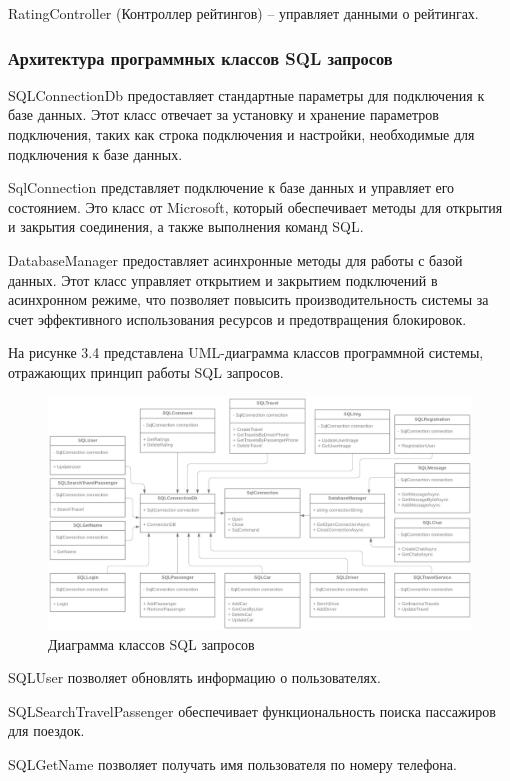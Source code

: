 RatingController (Контроллер рейтингов) -- управляет данными о рейтингах.


\subsubsection{Архитектура программных классов SQL запросов}

SQLConnectionDb предоставляет стандартные параметры для подключения к базе данных. Этот класс отвечает за установку и хранение параметров подключения, таких как строка подключения и настройки, необходимые для подключения к базе данных.

SqlConnection представляет подключение к базе данных и управляет его состоянием. Это класс от Microsoft, который обеспечивает методы для открытия и закрытия соединения, а также выполнения команд SQL.

DatabaseManager предоставляет асинхронные методы для работы с базой данных. Этот класс управляет открытием и закрытием подключений в асинхронном режиме, что позволяет повысить производительность системы за счет эффективного использования ресурсов и предотвращения блокировок.

На рисунке 3.4 представлена UML-диаграмма классов программной системы, отражающих принцип работы SQL запросов.

\begin{figure}[H]
	\centering
	\includegraphics[width=0.9\linewidth]{images/DiagramArch3}
	\caption{Диаграмма классов SQL запросов}
	\label{fig:diagramarch3}
\end{figure}

SQLUser позволяет обновлять информацию о пользователях.

SQLSearchTravelPassenger обеспечивает функциональность поиска пассажиров для поездок.

SQLGetName позволяет получать имя пользователя по номеру телефона.

